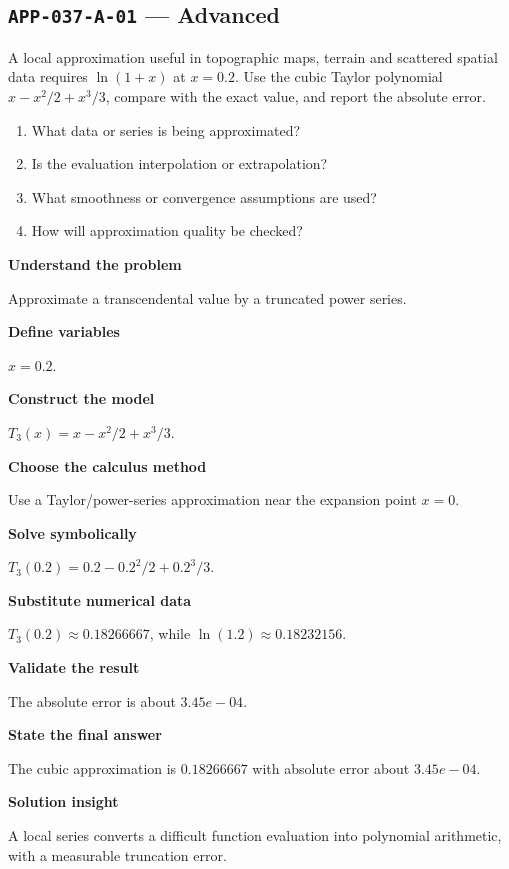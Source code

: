\documentclass[11pt]{book}
\newcommand{\pid}[1]{\texttt{#1}}
\begin{document}
\subsection*{\pid{APP-037-A-01} — Advanced}
\begin{problembox}
A local approximation useful in topographic maps, terrain and scattered spatial data requires $\ln(1+x)$ at $x=0.2$. Use the cubic Taylor polynomial $x-x^2/2+x^3/3$, compare with the exact value, and report the absolute error.
\end{problembox}
\begin{promptbox}\begin{enumerate}
\item What data or series is being approximated?
\item Is the evaluation interpolation or extrapolation?
\item What smoothness or convergence assumptions are used?
\item How will approximation quality be checked?
\end{enumerate}\end{promptbox}
\begin{solutionbox}
\textbf{Understand the problem}\par Approximate a transcendental value by a truncated power series.\par\medskip
\textbf{Define variables}\par $x=0.2$.\par\medskip
\textbf{Construct the model}\par $T_3(x)=x-x^2/2+x^3/3$.\par\medskip
\textbf{Choose the calculus method}\par Use a Taylor/power-series approximation near the expansion point $x=0$.\par\medskip
\textbf{Solve symbolically}\par $T_3(0.2)=0.2-0.2^2/2+0.2^3/3$.\par\medskip
\textbf{Substitute numerical data}\par $T_3(0.2)\approx 0.18266667$, while $\ln(1.2)\approx 0.18232156$.\par\medskip
\textbf{Validate the result}\par The absolute error is about $3.45e-04$.\par\medskip
\textbf{State the final answer}\par The cubic approximation is $0.18266667$ with absolute error about $3.45e-04$.\par\medskip
\textbf{Solution insight}\par A local series converts a difficult function evaluation into polynomial arithmetic, with a measurable truncation error.\par\medskip
\end{solutionbox}
\end{document}
